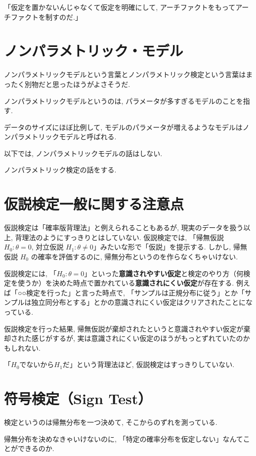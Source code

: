 \documentclass[12pt]{jsarticle}
\begin{document}
「仮定を置かないんじゃなくて仮定を明確にして, アーチファクトをもってアーチファクトを制すのだ.」

\section{ノンパラメトリック・モデル}

ノンパラメトリックモデルという言葉とノンパラメトリック検定という言葉はまったく別物だと思ったほうがよさそうだ.

ノンパラメトリックモデルというのは, パラメータが多すぎるモデルのことを指す.

データのサイズにほぼ比例して, モデルのパラメータが増えるようなモデルはノンパラメトリックモデルと呼ばれる. 

以下では, ノンパラメトリックモデルの話はしない. 

ノンパラメトリック検定の話をする. 

\section{仮説検定一般に関する注意点}

仮説検定は「確率版背理法」と例えられることもあるが, 現実のデータを扱う以上, 背理法のようにすっきりとはしていない.
仮説検定では, 「帰無仮説 $H_0: \theta = 0$, 対立仮説 $H_1: \theta \neq 0$」みたいな形で「仮説」を提示する. 
しかし, 帰無仮説 $H_0$ の確率を評価するのに, 帰無分布というのを作らなくちゃいけない.

仮説検定には, 「$H_0: \theta = 0$」といった\textbf{意識されやすい仮定}と検定のやり方（何検定を使うか）を決めた時点で置かれている\textbf{意識されにくい仮定}が存在する. 例えば「○○検定を行った」と言った時点で, 「サンプルは正規分布に従う」とか「サンプルは独立同分布とする」とかの意識されにくい仮定はクリアされたことになっている. 

仮説検定を行った結果, 帰無仮説が棄却されたというと意識されやすい仮定が棄却された感じがするが, 実は意識されにくい仮定のほうがもっとずれていたのかもしれない.

「$H_0$でないから$H_1$だ」という背理法ほど, 仮説検定はすっきりしていない.

\section{符号検定（Sign Test）}

検定というのは帰無分布を一つ決めて, そこからのずれを測っている. 

帰無分布を決めなきゃいけないのに, 「特定の確率分布を仮定しない」なんてことができるのか. 
\end{document}

